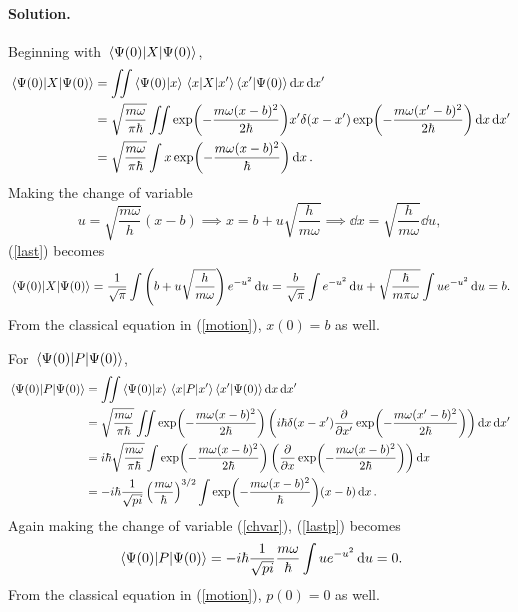 \documentclass[11pt]{article}
\newcommand{\refeq}[1]{(\ref{#1})}
\newenvironment{solution}
{
    \paragraph{Solution.}
    \ignorespaces
}
{
}
\begin{document}
\begin{solution}
	Beginning with $\ev{X}{\Psio}$,
	\begin{align}
		\ev{X}{\Psio} &= \iint \braket{\Psio}{x} \mel{x}{X}{x'} \braket{x'}{\Psio} \dd{x} \dd{x'} \\
		&= \sqrt{\frac{m \omega}{\pi \hbar}} \iint \exp(-\frac{m \omega (x - b)^2}{2 \hbar}) x' \delta(x - x') \exp(-\frac{m \omega (x' - b)^2}{2 \hbar}) \dd{x} \dd{x'} \\
		&= \sqrt{\frac{m \omega}{\pi \hbar}} \int x \exp(-\frac{m \omega (x - b)^2}{\hbar}) \dd{x}. \label{last}
	\end{align}
	Making the change of variable
	\begin{equation} \label{chvar}
		u = \sqrt{\frac{m\omega}{h}} (x - b) \implies x = b + u \sqrt{\frac{h}{m\omega}} \implies \dd{x} = \sqrt{\frac{h}{m\omega}} \dd{u}, 
	\end{equation}
	\refeq{last} becomes
	\begin{equation}
		\ev{X}{\Psio} = \frac{1}{\sqrt{\pi}} \int \left(b + u \sqrt{\frac{h}{m\omega}} \right) e^{-u^2} \dd{u} = \frac{b}{\sqrt{\pi}} \int e^{-u^2} \dd{u} + \sqrt{\frac{\hbar}{m \pi \omega}} \int u e^{-u^2} \dd{u} = b.
	\end{equation}
	From the classical equation in \refeq{motion}, $x(0) = b$ as well.
	
	For $\ev{P}{\Psio}$,
	\begin{align}
		\ev{P}{\Psio} &= \iint \braket{\Psio}{x} \mel{x}{P}{x'} \braket{x'}{\Psio} \dd{x} \dd{x'} \\
		&= \sqrt{\frac{m \omega}{\pi \hbar}} \iint \exp(-\frac{m \omega (x - b)^2}{2 \hbar}) \left( \ihb \delta(x - x') \pdv{}{x'} \exp(-\frac{m \omega (x' - b)^2}{2 \hbar}) \right) \dd{x} \dd{x'} \\
		&= \ihb \sqrt{\frac{m \omega}{\pi \hbar}} \int \exp(-\frac{m \omega (x - b)^2}{2 \hbar}) \left(\pdv{}{x} \exp(-\frac{m \omega (x - b)^2}{2 \hbar}) \right) \dd{x} \\
		&= -\ihb \frac{1}{\sqrt{pi}} \left( \frac{m \omega}{\hbar} \right)^{3/2} \int \exp(-\frac{m \omega (x - b)^2}{\hbar}) (x - b) \dd{x}. \label{lastp}
	\end{align}
	Again making the change of variable \refeq{chvar}, \refeq{lastp} becomes
	\begin{equation}
		\ev{P}{\Psio} = -\ihb \frac{1}{\sqrt{pi}} \frac{m \omega}{\hbar} \int u e^{-u^2} \dd{u} = 0.
	\end{equation}
	From the classical equation in \refeq{motion}, $p(0) = 0$ as well.
\end{solution}
\end{document}
